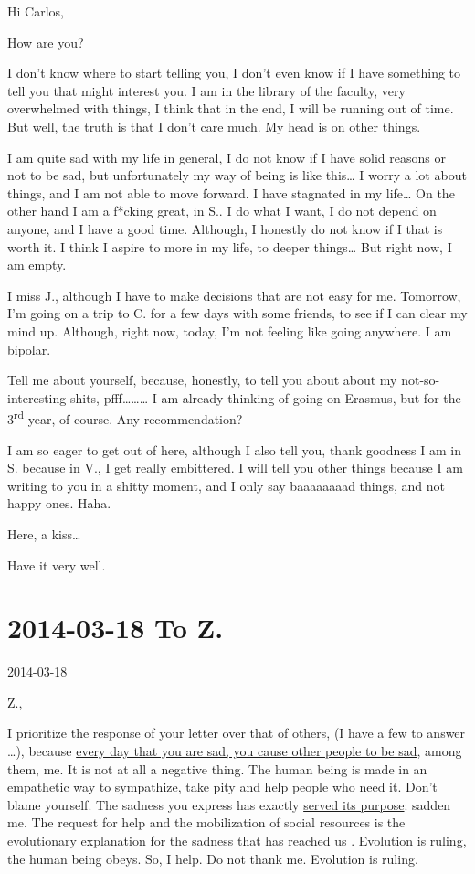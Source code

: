 \documentclass[]{book}
\begin{document}
Hi Carlos,

How are you?

I don't know where to start telling you, I don't even know if I have something to tell you that might interest you. I am in the library of the faculty, very overwhelmed with things, I think that in the end, I will be running out of time. But well, the truth is that I don't care much. My head is on other things.

I am quite sad with my life in general, I do not know if I have solid reasons or not to be sad, but unfortunately my way of being is like this\ldots{} I worry a lot about things, and I am not able to move forward. I have stagnated in my life\ldots{} On the other hand I am a f*cking great, in S.. I do what I want, I do not depend on anyone, and I have a good time. Although, I honestly do not know if I that is worth it. I think I aspire to more in my life, to deeper things\ldots{} But right now, I am empty.

I miss J., although I have to make decisions that are not easy for me. Tomorrow, I'm going on a trip to C. for a few days with some friends, to see if I can clear my mind up. Although, right now, today, I'm not feeling like going anywhere. I am bipolar.

Tell me about yourself, because, honestly, to tell you about about my not-so-interesting shits, pfff\ldots\ldots\ldots{} I am already thinking of going on Erasmus, but for the 3\textsuperscript{rd} year, of course. Any recommendation?

I am so eager to get out of here, although I also tell you, thank goodness I am in S. because in V., I get really embittered. I will tell you other things because I am writing to you in a shitty moment, and I only say baaaaaaaad things, and not happy ones. Haha.

Here, a kiss\ldots{}

Have it very well.

\hypertarget{toZ20140318}{%
\section*{2014-03-18 To Z.}\label{toZ20140318}}

2014-03-18

Z.,

I prioritize the response of your letter over that of others, (I have a few to answer \ldots), because \href{https://www.bmj.com/content/337/bmj.a2338}{every day that you are sad, you cause other people to be sad}\citep{fowler2008dynamic, kramer2014experimental, coviello2014detecting}, among them, me. It is not at all a negative thing. The human being is made in an empathetic way to sympathize, take pity and help people who need it. Don't blame yourself. The sadness you express has exactly \href{https://en.wikipedia.org/wiki/Sadness}{served its purpose}: sadden me. The request for help and the mobilization of social resources is the evolutionary explanation for the sadness that has reached us \citep{nesse1990evolutionary}. Evolution is ruling, the human being obeys. So, I help. Do not thank me. Evolution is ruling.
\end{document}
